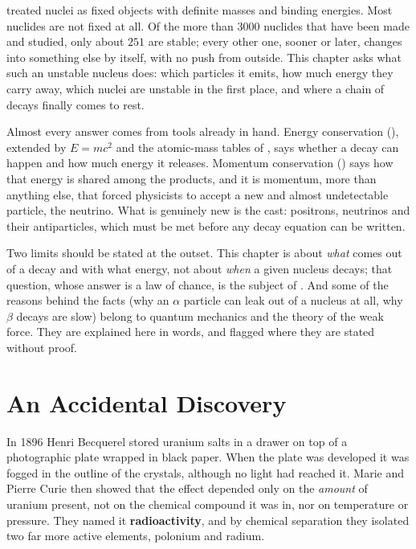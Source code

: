 
 treated nuclei as fixed objects with definite masses and binding energies. Most
nuclides are not fixed at all. Of the more than $3000$ nuclides that have been made and studied, only
about $251$ are stable; every other one, sooner or later, changes into something else by itself, with no
push from outside. This chapter asks what such an unstable nucleus does: which particles it emits, how
much energy they carry away, which nuclei are unstable in the first place, and where a chain of decays
finally comes to rest.

Almost every answer comes from tools already in hand. Energy conservation (), extended
by $E=mc^2$ and the atomic-mass tables of , says whether a decay can happen and how much
energy it releases. Momentum conservation () says how that energy is shared among
the products, and it is momentum, more than anything else, that forced physicists to accept a new and
almost undetectable particle, the neutrino. What is genuinely new is the cast: positrons, neutrinos and
their antiparticles, which must be met before any decay equation can be written.

Two limits should be stated at the outset. This chapter is about \emph{what} comes out of a decay and
with what energy, not about \emph{when} a given nucleus decays; that question, whose answer is a law of
chance, is the subject of . And some of the reasons behind the facts (why an $\alpha$
particle can leak out of a nucleus at all, why $\beta$ decays are slow) belong to quantum mechanics and
the theory of the weak force. They are explained here in words, and flagged where they are stated
without proof.

\section{An Accidental Discovery}\label{sec:decay-discovery}

In 1896 Henri Becquerel stored uranium salts in a drawer on top of a photographic plate wrapped in black
paper. When the plate was developed it was fogged in the outline of the crystals, although no light had
reached it. Marie and Pierre Curie then showed that the effect depended only on the \emph{amount} of
uranium present, not on the chemical compound it was in, nor on temperature or pressure. They named it
\textbf{radioactivity}, and by chemical separation they isolated two far more active elements, polonium
and radium.

